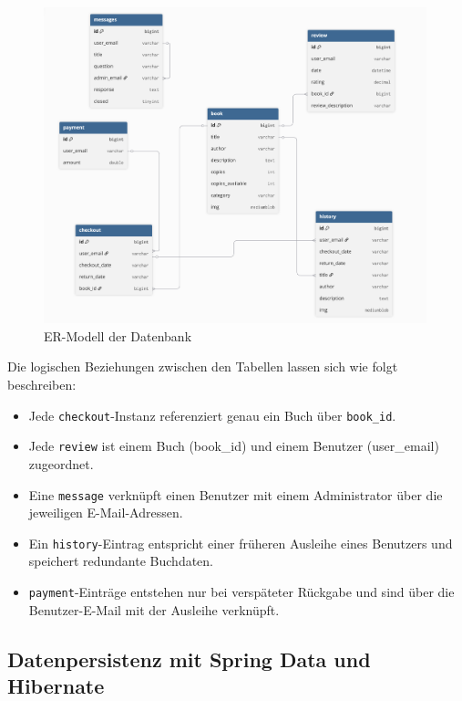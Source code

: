 \begin{figure}[H]
	\centering
	\includegraphics[width=0.99\textwidth]{images/DB-Schema.png}
	\caption{ER-Modell der Datenbank}
	\label{fig:er-model}
\end{figure}

\noindent Die logischen Beziehungen zwischen den Tabellen lassen sich wie folgt beschreiben:

\begin{itemize}
	\item Jede \texttt{checkout}-Instanz referenziert genau ein Buch über \texttt{book\_id}.
	\item Jede \texttt{review} ist einem Buch (book\_id) und einem Benutzer (user\_email) zugeordnet.
	\item Eine \texttt{message} verknüpft einen Benutzer mit einem Administrator über die jeweiligen E-Mail-Adressen.
	\item Ein \texttt{history}-Eintrag entspricht einer früheren Ausleihe eines Benutzers und speichert redundante Buchdaten.
	\item \texttt{payment}-Einträge entstehen nur bei verspäteter Rückgabe und sind über die Benutzer-E-Mail mit der Ausleihe verknüpft.
\end{itemize}


\subsection{Datenpersistenz mit Spring Data und Hibernate}

